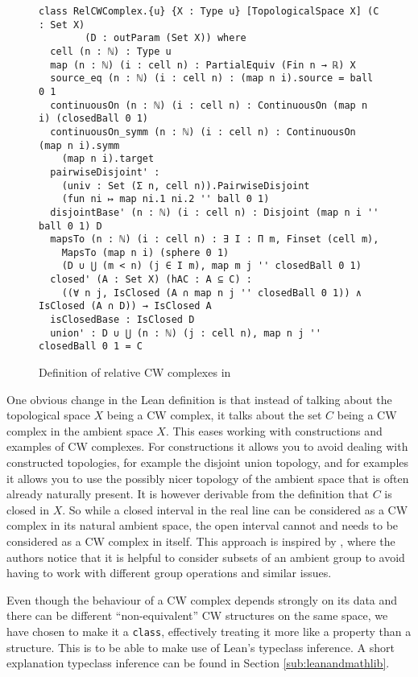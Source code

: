 \begin{figure}
\caption{Definition of relative CW complexes in \mathlib}
\label{fig:def}
\begin{lstlisting}[frame=single]
    class RelCWComplex.{u} {X : Type u} [TopologicalSpace X] (C : Set X) 
        (D : outParam (Set X)) where
  cell (n : ℕ) : Type u
  map (n : ℕ) (i : cell n) : PartialEquiv (Fin n → ℝ) X
  source_eq (n : ℕ) (i : cell n) : (map n i).source = ball 0 1
  continuousOn (n : ℕ) (i : cell n) : ContinuousOn (map n i) (closedBall 0 1)
  continuousOn_symm (n : ℕ) (i : cell n) : ContinuousOn (map n i).symm 
    (map n i).target
  pairwiseDisjoint' :
    (univ : Set (Σ n, cell n)).PairwiseDisjoint 
    (fun ni ↦ map ni.1 ni.2 '' ball 0 1)
  disjointBase' (n : ℕ) (i : cell n) : Disjoint (map n i '' ball 0 1) D
  mapsTo (n : ℕ) (i : cell n) : ∃ I : Π m, Finset (cell m),
    MapsTo (map n i) (sphere 0 1) 
    (D ∪ ⋃ (m < n) (j ∈ I m), map m j '' closedBall 0 1)
  closed' (A : Set X) (hAC : A ⊆ C) :
    ((∀ n j, IsClosed (A ∩ map n j '' closedBall 0 1)) ∧ IsClosed (A ∩ D)) → IsClosed A
  isClosedBase : IsClosed D
  union' : D ∪ ⋃ (n : ℕ) (j : cell n), map n j '' closedBall 0 1 = C
\end{lstlisting}
\end{figure}

One obvious change in the Lean definition is that instead of talking about the topological space $X$ being a CW complex, it talks about the set $C$ being a CW complex in the ambient space $X$.
This eases working with constructions and examples of CW complexes. 
For constructions it allows you to avoid dealing with constructed topologies, for example the disjoint union topology, and for examples it allows you to use the possibly nicer topology of the ambient space that is often already naturally present. 
It is however derivable from the definition that $C$ is closed in $X$. 
So while a closed interval in the real line can be considered as a CW complex in its natural ambient space, the open interval cannot and needs to be considered as a CW complex in itself. 
This approach is inspired by \cite{Gonthier2013}, where the authors notice that it is helpful to consider subsets of an ambient group to avoid having to work with different group operations and similar issues.

Even though the behaviour of a CW complex depends strongly on its data and there can be different ``non-equivalent'' CW structures on the same space, we have chosen to make it a \lstinline|class|, effectively treating it more like a property than a structure. 
This is to be able to make use of Lean's typeclass inference.
A short explanation typeclass inference can be found in Section \ref{sub:leanandmathlib}.

